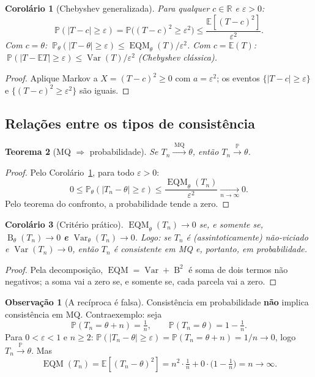 \documentclass[11pt,a4paper]{article}
\theoremstyle{definition}
\newtheorem{observacao}{Observação}[section]
\theoremstyle{plain}
\newtheorem{teorema}{Teorema}[section]
\newtheorem{corolario}[teorema]{Corolário}
\newcommand{\E}{\mathbb{E}}
\newcommand{\Var}{\operatorname{Var}}
\newcommand{\EQM}{\operatorname{EQM}}
\newcommand{\B}{\operatorname{B}}
\newcommand{\Prob}{\mathbb{P}}
\newcommand{\R}{\mathbb{R}}
\newcommand{\convP}{\xrightarrow{\;\Prob\;}}
\newcommand{\convMQ}{\xrightarrow{\;\text{MQ}\;}}
\begin{document}
\begin{corolario}[Chebyshev generalizada]\label{cor:cheb}
Para qualquer $c\in\R$ e $\varepsilon>0$:
\[
\Prob(|T-c|\ge\varepsilon)=\Prob\big((T-c)^2\ge\varepsilon^2\big)\le\frac{\E[(T-c)^2]}{\varepsilon^2}.
\]
Com $c=\theta$: $\ \Prob_\theta(|T-\theta|\ge\varepsilon)\le\EQM_\theta(T)/\varepsilon^2$.
Com $c=\E(T)$: $\ \Prob(|T-\E T|\ge\varepsilon)\le\Var(T)/\varepsilon^2$ (Chebyshev clássica).
\end{corolario}
\begin{proof}
Aplique Markov a $X=(T-c)^2\ge 0$ com $a=\varepsilon^2$; os eventos $\{|T-c|\ge\varepsilon\}$ e $\{(T-c)^2\ge\varepsilon^2\}$ são iguais.
\end{proof}

\subsection{Relações entre os tipos de consistência}

\begin{teorema}[MQ $\Rightarrow$ probabilidade]\label{teo:mq_p}
Se $T_n\convMQ\theta$, então $T_n\convP\theta$.
\end{teorema}
\begin{proof}
Pelo Corolário~\ref{cor:cheb}, para todo $\varepsilon>0$:
\[
0\le\Prob_\theta(|T_n-\theta|\ge\varepsilon)\le\frac{\EQM_\theta(T_n)}{\varepsilon^2}\xrightarrow[n\to\infty]{}0 .
\]
Pelo teorema do confronto, a probabilidade tende a zero.
\end{proof}

\begin{corolario}[Critério prático]\label{cor:criterio}
$\EQM_\theta(T_n)\to 0$ se, e somente se, $\B_\theta(T_n)\to 0$ \textbf{e} $\Var_\theta(T_n)\to 0$.
Logo: se $T_n$ é (assintoticamente) não-viciado e $\Var(T_n)\to 0$, então $T_n$ é consistente em MQ e, portanto, em probabilidade.
\end{corolario}
\begin{proof}
Pela decomposição, $\EQM=\Var+\B^2$ é soma de dois termos não negativos; a soma vai a zero se, e somente se, cada parcela vai a zero.
\end{proof}

\begin{observacao}[A recíproca é falsa]
Consistência em probabilidade \textbf{não} implica consistência em MQ. Contraexemplo: seja
\[
\Prob(T_n=\theta+n)=\tfrac1n,\qquad \Prob(T_n=\theta)=1-\tfrac1n .
\]
Para $0<\varepsilon<1$ e $n\ge 2$: $\Prob(|T_n-\theta|\ge\varepsilon)=\Prob(T_n=\theta+n)=1/n\to0$, logo $T_n\convP\theta$. Mas
\[
\EQM(T_n)=\E[(T_n-\theta)^2]=n^2\cdot\tfrac1n+0\cdot\big(1-\tfrac1n\big)=n\to\infty .
\]
\end{observacao}
\end{document}
